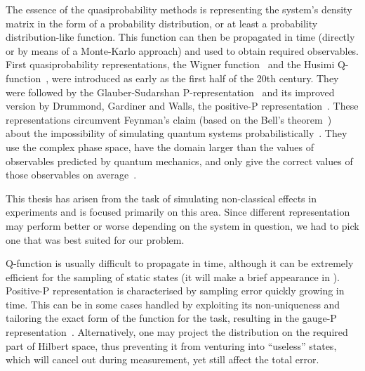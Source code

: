 The essence of the quasiprobability methods is representing the system's density matrix in the form of a probability distribution, or at least a probability distribution-like function.
This function can then be propagated in time (directly or by means of a Monte-Karlo approach) and used to obtain required observables.
First quasiprobability representations, the Wigner function~\cite{Wigner1932,Dirac1945,Moyal1947} and the Husimi Q-function~\cite{Husimi1940}, were introduced as early as the first half of the 20th century.
They were followed by the Glauber-Sudarshan P-representation~\cite{Sudarshan1963,Glauber1963b,Glauber1963} and its improved version by Drummond, Gardiner and Walls, the positive-P representation~\cite{Drummond1980,Drummond1981}.
These representations circumvent Feynman's claim (based on the Bell's theorem~\cite{Bell1964}) about the impossibility of simulating quantum systems probabilistically~\cite{Feynman1982}.
They use the complex phase space, have the domain larger than the values of observables predicted by quantum mechanics, and only give the correct values of those observables on average~\cite{Opanchuk2013-bell-sim}.

This thesis has arisen from the task of simulating non-classical effects in  experiments and is focused primarily on this area.
Since different representation may perform better or worse depending on the system in question, we had to pick one that was best suited for our problem.

Q-function is usually difficult to propagate in time, although it can be extremely efficient for the sampling of static states (it will make a brief appearance in ).
Positive-P representation is characterised by sampling error quickly growing in time.
This can be in some cases handled by exploiting its non-uniqueness and tailoring the exact form of the function for the task, resulting in the gauge-P representation~\cite{Deuar2002}.
Alternatively, one may project the distribution on the required part of Hilbert space, thus preventing it from venturing into ``useless'' states, which will cancel out during measurement, yet still affect the total error.


